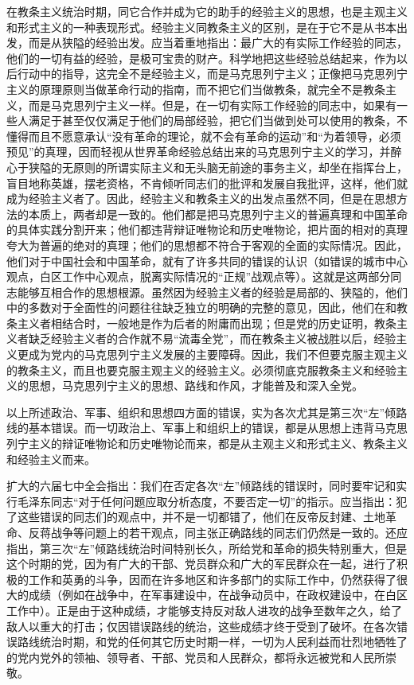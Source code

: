 在教条主义统治时期，同它合作并成为它的助手的经验主义的思想，也是主观主义和形式主义的一种表现形式。经验主义同教条主义的区别，是在于它不是从书本出发，而是从狭隘的经验出发。应当着重地指出：最广大的有实际工作经验的同志，他们的一切有益的经验，是极可宝贵的财产。科学地把这些经验总结起来，作为以后行动中的指导，这完全不是经验主义，而是马克思列宁主义；正像把马克思列宁主义的原理原则当做革命行动的指南，而不把它们当做教条，就完全不是教条主义，而是马克思列宁主义一样。但是，在一切有实际工作经验的同志中，如果有一些人满足于甚至仅仅满足于他们的局部经验，把它们当做到处可以使用的教条，不懂得而且不愿意承认“没有革命的理论，就不会有革命的运动”和“为着领导，必须预见”的真理，因而轻视从世界革命经验总结出来的马克思列宁主义的学习，并醉心于狭隘的无原则的所谓实际主义和无头脑无前途的事务主义，却坐在指挥台上，盲目地称英雄，摆老资格，不肯倾听同志们的批评和发展自我批评，这样，他们就成为经验主义者了。因此，经验主义和教条主义的出发点虽然不同，但是在思想方法的本质上，两者却是一致的。他们都是把马克思列宁主义的普遍真理和中国革命的具体实践分割开来；他们都违背辩证唯物论和历史唯物论，把片面的相对的真理夸大为普遍的绝对的真理；他们的思想都不符合于客观的全面的实际情况。因此，他们对于中国社会和中国革命，就有了许多共同的错误的认识（如错误的城市中心观点，白区工作中心观点，脱离实际情况的“正规”战观点等）。这就是这两部分同志能够互相合作的思想根源。虽然因为经验主义者的经验是局部的、狭隘的，他们中的多数对于全面性的问题往往缺乏独立的明确的完整的意见，因此，他们在和教条主义者相结合时，一般地是作为后者的附庸而出现；但是党的历史证明，教条主义者缺乏经验主义者的合作就不易“流毒全党”，而在教条主义被战胜以后，经验主义更成为党内的马克思列宁主义发展的主要障碍。因此，我们不但要克服主观主义的教条主义，而且也要克服主观主义的经验主义。必须彻底克服教条主义和经验主义的思想，马克思列宁主义的思想、路线和作风，才能普及和深入全党。

以上所述政治、军事、组织和思想四方面的错误，实为各次尤其是第三次“左”倾路线的基本错误。而一切政治上、军事上和组织上的错误，都是从思想上违背马克思列宁主义的辩证唯物论和历史唯物论而来，都是从主观主义和形式主义、教条主义和经验主义而来。

扩大的六届七中全会指出：我们在否定各次“左”倾路线的错误时，同时要牢记和实行毛泽东同志“对于任何问题应取分析态度，不要否定一切”的指示。应当指出：犯了这些错误的同志们的观点中，并不是一切都错了，他们在反帝反封建、土地革命、反蒋战争等问题上的若干观点，同主张正确路线的同志们仍然是一致的。还应指出，第三次“左”倾路线统治时间特别长久，所给党和革命的损失特别重大，但是这个时期的党，因为有广大的干部、党员群众和广大的军民群众在一起，进行了积极的工作和英勇的斗争，因而在许多地区和许多部门的实际工作中，仍然获得了很大的成绩（例如在战争中，在军事建设中，在战争动员中，在政权建设中，在白区工作中）。正是由于这种成绩，才能够支持反对敌人进攻的战争至数年之久，给了敌人以重大的打击；仅因错误路线的统治，这些成绩才终于受到了破坏。在各次错误路线统治时期，和党的任何其它历史时期一样，一切为人民利益而壮烈地牺牲了的党内党外的领袖、领导者、干部、党员和人民群众，都将永远被党和人民所崇敬。


